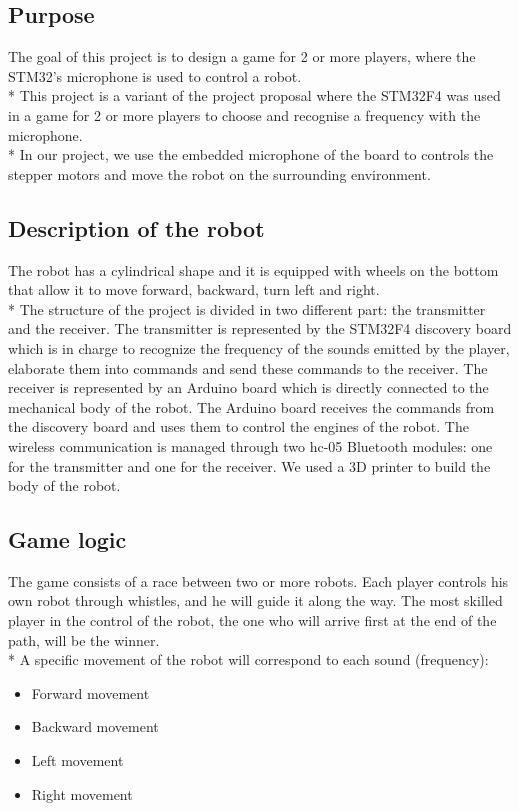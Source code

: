 \subsection{Purpose}
The goal of this project is to design a game for 2 or more players, where the STM32’s microphone is used to control a robot.\\*
This project is a variant of the project proposal where the STM32F4 was used in a game for 2 or more players to choose and recognise a frequency with the microphone.\\*
In our project, we use the embedded microphone of the board to controls the stepper motors and move the robot on the surrounding environment.

\subsection{Description of the robot}
The robot has a cylindrical shape and it is equipped with wheels on the bottom that allow it to move forward, backward, turn left and right.\\*
The structure of the project is divided in two different part: the transmitter and the receiver.
The transmitter is represented by the STM32F4 discovery board which is in charge to recognize the frequency of the sounds emitted by the player, elaborate them into commands and send these commands to the receiver.
The receiver is represented by an Arduino board which is directly connected to the mechanical body of the robot. The Arduino board receives the commands from the discovery board and uses them to control the engines of the robot.
The wireless communication is managed through two hc-05 Bluetooth modules: one for the transmitter and one for the receiver.
We used a 3D printer to build the body of the robot. 

\subsection{Game logic}
The game consists of a race between two or more robots. Each player controls his own robot through whistles, and he will guide it along the way. The most skilled player in the control of the robot, the one who will arrive first at the end of the path, will be the winner.\\*
A specific movement of the robot will correspond to each sound (frequency):
\begin{itemize}
	\item Forward movement
	\item Backward movement
	\item Left movement
	\item Right movement
\end{itemize}

